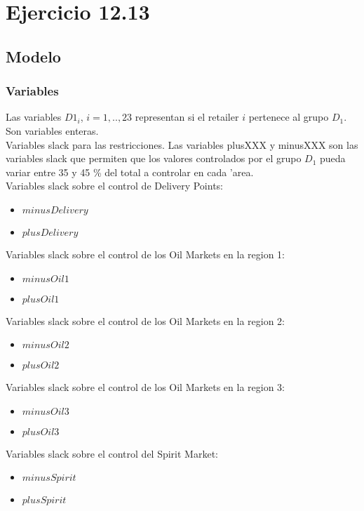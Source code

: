 \section{Ejercicio 12.13}
\subsection{Modelo}
\subsubsection{Variables}
Las variables ${D1}_i$, $i = 1, .. ,23$ representan si el retailer $i$ pertenece al grupo ${D}_1$. Son variables enteras. \\
Variables slack para las restricciones. Las variables plusXXX y minusXXX son las variables slack que permiten que los valores controlados por el grupo $D_1$ pueda variar entre 35 y 45 \% del total a controlar en cada 'area. \\
Variables slack sobre el control de Delivery Points:
\begin{itemize}
\item $minusDelivery$ 
\item $plusDelivery$ 
\end{itemize}
Variables slack sobre el control de los Oil Markets en la region 1:
\begin{itemize}
\item $minusOil1$ 
\item $plusOil1$ 
\end{itemize}
Variables slack sobre el control de los Oil Markets en la region 2:
\begin{itemize}
\item $minusOil2$ 
\item $plusOil2$ 
\end{itemize}
Variables slack sobre el control de los Oil Markets en la region 3:
\begin{itemize}
\item $minusOil3$ 
\item $plusOil3$ 
\end{itemize}
Variables slack sobre el control del Spirit Market:
\begin{itemize}
\item $minusSpirit$ 
\item $plusSpirit$ 
\end{itemize}
